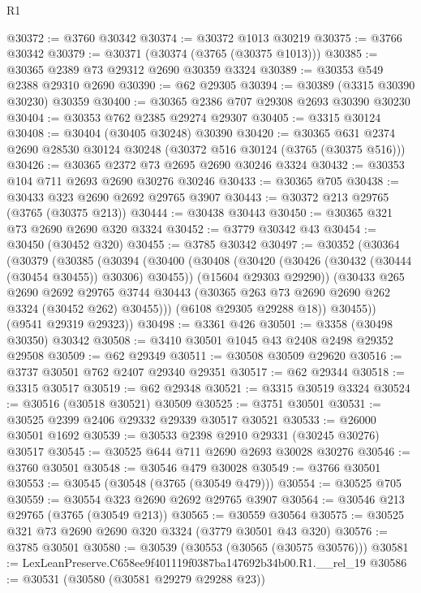 \begin{lexlean}{R1}
\begin{coremodule}
@30372 := @3760 @30342
@30374 := @30372 @1013 @30219
@30375 := @3766 @30342
@30379 := @30371 (@30374 (@3765 (@30375 @1013)))
@30385 := @30365 @2389 @73 @29312 @2690 @30359 @3324
@30389 := @30353 @549 @2388 @29310 @2690
@30390 := @62 @29305
@30394 := @30389 (@3315 @30390 @30230) @30359
@30400 := @30365 @2386 @707 @29308 @2693 @30390 @30230
@30404 := @30353 @762 @2385 @29274 @29307
@30405 := @3315 @30124
@30408 := @30404 (@30405 @30248) @30390
@30420 := @30365 @631 @2374 @2690 @28530 @30124 @30248 (@30372 @516 @30124 (@3765 (@30375 @516)))
@30426 := @30365 @2372 @73 @2695 @2690 @30246 @3324
@30432 := @30353 @104 @711 @2693 @2690 @30276 @30246
@30433 := @30365 @705
@30438 := @30433 @323 @2690 @2692 @29765 @3907
@30443 := @30372 @213 @29765 (@3765 (@30375 @213))
@30444 := @30438 @30443
@30450 := @30365 @321 @73 @2690 @2690 @320 @3324
@30452 := @3779 @30342 @43
@30454 := @30450 (@30452 @320)
@30455 := @3785 @30342
@30497 := @30352
    (@30364
      (@30379
        (@30385
          (@30394
            (@30400
              (@30408
                (@30420 (@30426 (@30432 (@30444 (@30454 @30455)) @30306) @30455))
                (@15604 @29303 @29290))
              (@30433
                @265
                @2690
                @2692
                @29765
                @3744
                @30443
                (@30365 @263 @73 @2690 @2690 @262 @3324 (@30452 @262) @30455)))
            (@6108 @29305 @29288 @18))
          @30455))
      (@9541 @29319 @29323))
@30498 := @3361 @426
@30501 := @3358 (@30498 @30350) @30342
@30508 := @3410 @30501 @1045 @43 @2408 @2498 @29352 @29508
@30509 := @62 @29349
@30511 := @30508 @30509 @29620
@30516 := @3737 @30501 @762 @2407 @29340 @29351
@30517 := @62 @29344
@30518 := @3315 @30517
@30519 := @62 @29348
@30521 := @3315 @30519 @3324
@30524 := @30516 (@30518 @30521) @30509
@30525 := @3751 @30501
@30531 := @30525 @2399 @2406 @29332 @29339 @30517 @30521
@30533 := @26000 @30501 @1692
@30539 := @30533 @2398 @2910 @29331 (@30245 @30276) @30517
@30545 := @30525 @644 @711 @2690 @2693 @30028 @30276
@30546 := @3760 @30501
@30548 := @30546 @479 @30028
@30549 := @3766 @30501
@30553 := @30545 (@30548 (@3765 (@30549 @479)))
@30554 := @30525 @705
@30559 := @30554 @323 @2690 @2692 @29765 @3907
@30564 := @30546 @213 @29765 (@3765 (@30549 @213))
@30565 := @30559 @30564
@30575 := @30525 @321 @73 @2690 @2690 @320 @3324 (@3779 @30501 @43 @320)
@30576 := @3785 @30501
@30580 := @30539 (@30553 (@30565 (@30575 @30576)))
@30581 := LexLeanPreserve.C658ee9f401119f0387ba147692b34b00.R1.__rel_19
@30586 := @30531 (@30580 (@30581 @29279 @29288 @23))

\end{coremodule}
\end{lexlean}
